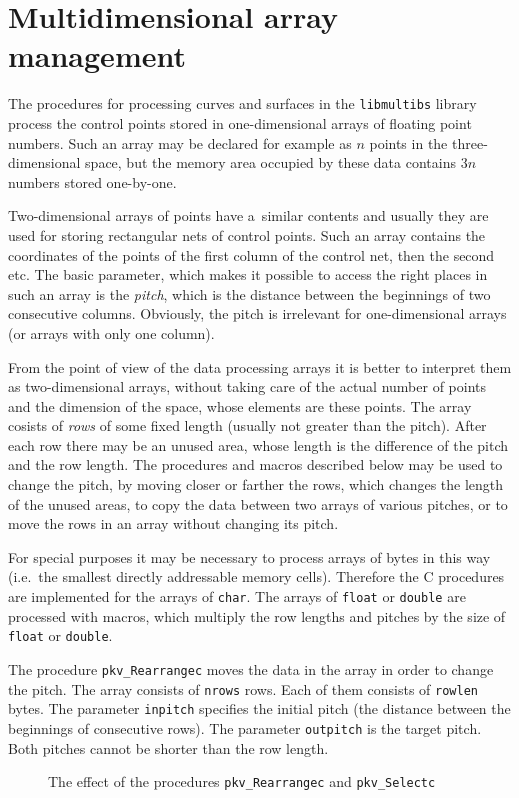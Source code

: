 \newpage
\section{Multidimensional array management}

The procedures for processing curves and surfaces in the \texttt{libmultibs}
library process the control points stored in one-dimensional arrays of
floating point numbers. Such an array may be declared for example as $n$
points in the three-dimensional space, but the memory area occupied by these
data contains $3n$ numbers stored one-by-one.

Two-dimensional arrays of points have a~similar contents and usually
they are used for storing rectangular nets of control points. Such an array
contains the coordinates of the points of the first column of the control net,
then the second etc. The basic parameter, which makes it possible to access
the right places in such an array is the \emph{pitch}, which is the
distance between the beginnings of two consecutive columns. Obviously,
the pitch is irrelevant for one-dimensional arrays (or arrays with only
one column).

From the point of view of the data processing arrays it is better to
interpret them as two-dimensional arrays, without taking care of
the actual number of points and the dimension of the space, whose elements
are these points. The array cosists of \emph{rows} of some fixed length
(usually not greater than the pitch).
After each row there may be an unused area, whose length is the difference
of the pitch and the row length. The procedures and macros described below
may be used to change the pitch, by moving closer or farther the rows,
which changes the length of the unused areas, to copy the data between two
arrays of various pitches, or to move the rows in an array without changing
its pitch.

For special purposes it may be necessary to process arrays of bytes in this
way (i.e.\ the smallest directly addressable memory cells). Therefore the
C procedures are implemented for the arrays of \texttt{char}. The arrays
of \texttt{float} or \texttt{double} are processed with macros, which
multiply the row lengths and pitches by the size of \texttt{float} or
\texttt{double}.

\vspace{\bigskipamount}
The procedure \texttt{pkv\_Rearrangec} moves the data in the array in order to
change the pitch. The array consists of \texttt{nrows} rows. Each of them
consists of \texttt{rowlen} bytes. The parameter \texttt{inpitch}
specifies the initial pitch (the distance between the beginnings of consecutive
rows).
The parameter \texttt{outpitch} is the target pitch. Both pitches cannot be
shorter than the row length.
\begin{figure}[ht]
  \centerline{}
  \caption{\label{fig:memory:1}The effect of the procedures \texttt{pkv\_Rearrangec}
    and \texttt{pkv\_Selectc}}
\end{figure}

